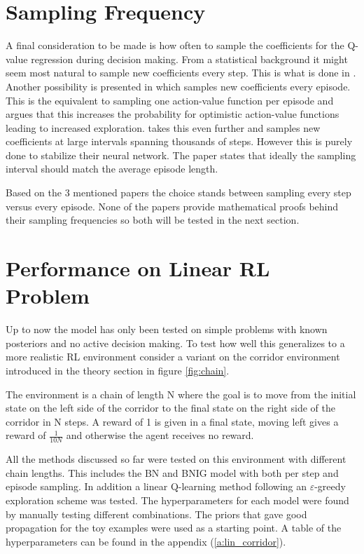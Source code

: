 \section{Sampling Frequency}

A final consideration to be made is how often to sample the coefficients for the Q-value regression during decision making. From a statistical background it might seem most natural to sample new coefficients every step. This is what is done in \cite{donoghue_2017}. Another possibility is presented in \cite{osband_2018} which samples new coefficients every episode. This is the equivalent to sampling one action-value function per episode and \cite{osband_2018} argues that this increases the probability for optimistic action-value functions leading to increased exploration. \cite{azziz_2018} takes this even further and samples new coefficients at large intervals spanning thousands of steps. However this is purely done to stabilize their neural network. The paper states that ideally the sampling interval should match the average episode length.

Based on the 3 mentioned papers the choice stands between sampling every step versus every episode. None of the papers provide mathematical proofs behind their sampling frequencies so both will be tested in the next section.

\section{Performance on Linear RL Problem}

Up to now the model has only been tested on simple problems with known posteriors and no active decision making. To test how well this generalizes to a more realistic RL environment consider a variant on the corridor environment introduced in the theory section in figure \ref{fig:chain}.

The environment is a chain of length N where the goal is to move from the initial state on the left side of the corridor to the final state on the right side of the corridor in N steps. A reward of 1 is given in a final state, moving left gives a reward of $\frac{1}{10N}$ and otherwise the agent receives no reward.

All the methods discussed so far were tested on this environment with different chain lengths. This includes the BN and BNIG model with both per step and episode sampling. In addition a linear Q-learning method following an $\varepsilon$-greedy exploration scheme was tested. The hyperparameters for each model were found by manually testing different combinations. The priors that gave good propagation for the toy examples were used as a starting point. A table of the hyperparameters can be found in the appendix (\ref{a:lin_corridor}).

